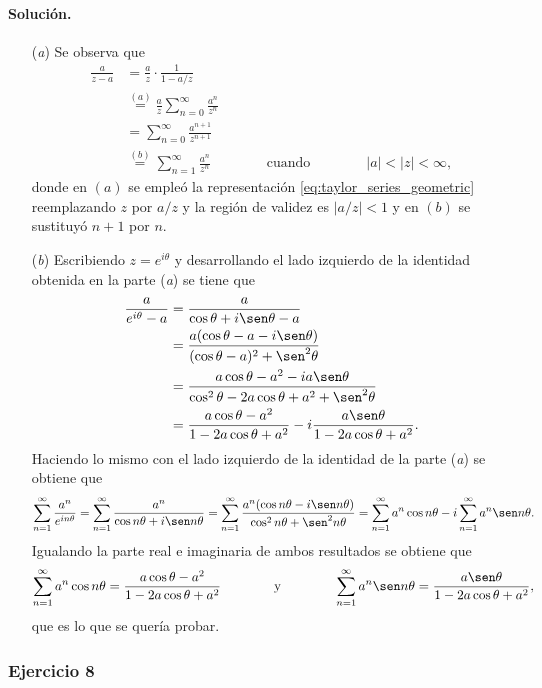 \documentclass[a4paper]{report}
\begin{document}
\paragraph{Solución.}

\begin{enumerate}
 \item[(\textit{a})] Se observa que 
 \begin{align*}
  \frac{a}{z-a}&=\frac{a}{z}\cdot\frac{1}{1-a/z}\\
   &\overset{(a)}{=}\frac{a}{z}\sum_{n=0}^\infty\frac{a^n}{z^n}\\
   &=\sum_{n=0}^\infty\frac{a^{n+1}}{z^{n+1}}\\
   &\overset{(b)}{=}\sum_{n=1}^\infty\frac{a^n}{z^n}
   \qquad\qquad\textrm{cuando}\qquad\qquad
  |a|<|z|<\infty,
 \end{align*}
 donde en \((a)\) se empleó la representación \ref{eq:taylor_series_geometric} reemplazando \(z\) por \(a/z\) y la región de validez es \(|a/z|<1\) y en \((b)\) se sustituyó \(n+1\) por \(n\).
 \item[(\textit{b})] Escribiendo \(z=e^{i\theta}\) y desarrollando el lado izquierdo de la identidad obtenida en la parte (\textit{a}) se tiene que
 \begin{align*}
  \frac{a}{e^{i\theta}-a}&=\frac{a}{\cos\theta+i\sen\theta-a}\\
    &=\frac{a(\cos\theta-a-i\sen\theta)}{(\cos\theta-a)^2+\sen^2\theta}\\
    &=\frac{a\cos\theta-a^2-ia\sen\theta}{\cos^2\theta-2a\cos\theta+a^2+\sen^2\theta}\\
    &=\frac{a\cos\theta-a^2}{1-2a\cos\theta+a^2}-i\frac{a\sen\theta}{1-2a\cos\theta+a^2}.
 \end{align*}
 Haciendo lo mismo con el lado izquierdo de la identidad de la parte (\textit{a}) se obtiene que 
 \[
  \sum_{n=1}^\infty\frac{a^n}{e^{in\theta}}=\sum_{n=1}^\infty\frac{a^n}{\cos n\theta+i\sen n\theta}
   =\sum_{n=1}^\infty\frac{a^n(\cos n\theta-i\sen n\theta)}{\cos^2n\theta+\sen^2n\theta}
   =\sum_{n=1}^\infty a^n\cos n\theta-i\sum_{n=1}^\infty a^n\sen n\theta.
 \]
 Igualando la parte real e imaginaria de ambos resultados se obtiene que 
 \[
  \sum_{n=1}^\infty a^n\cos n\theta=\frac{a\cos\theta-a^2}{1-2a\cos\theta+a^2}
  \qquad\qquad\textrm{y}\qquad\qquad
  \sum_{n=1}^\infty a^n\sen n\theta=\frac{a\sen\theta}{1-2a\cos\theta+a^2},
 \]
 que es lo que se quería probar.
\end{enumerate} 

\subsubsection*{Ejercicio 8} 
\end{document}
